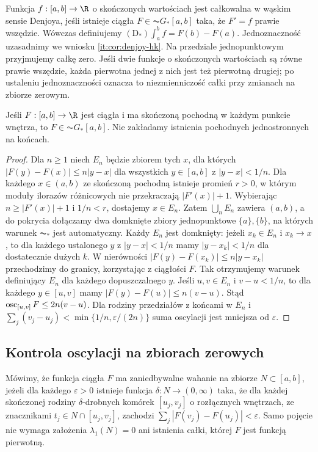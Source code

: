 \begin{definicja}\label{it:def:denjoy-narrow}
Funkcja $f:[a,b]\to\R$ o skończonych wartościach jest całkowalna w wąskim sensie Denjoya, jeśli istnieje ciągła $F\in\AC G_*[a,b]$ taka, że $F'=f$ prawie wszędzie. Wówczas definiujemy $(\mathrm D_*)\int_a^b f=F(b)-F(a)$. Jednoznaczność uzasadnimy we wniosku \ref{it:cor:denjoy-hk}. Na przedziale jednopunktowym przyjmujemy całkę zero. Jeśli dwie funkcje o skończonych wartościach są równe prawie wszędzie, każda pierwotna jednej z nich jest też pierwotną drugiej; po ustaleniu jednoznaczności oznacza to niezmienniczość całki przy zmianach na zbiorze zerowym.
\end{definicja}
\begin{twierdzenie}\label{it:thm:differentiable-acgstar}
Jeśli $F:[a,b]\to\R$ jest ciągła i ma skończoną pochodną w każdym punkcie wnętrza, to $F\in\AC G_*[a,b]$. Nie zakładamy istnienia pochodnych jednostronnych na końcach.
\end{twierdzenie}
\begin{proof}
Dla $n\ge1$ niech $E_n$ będzie zbiorem tych $x$, dla których $|F(y)-F(x)|\le n|y-x|$ dla wszystkich $y\in[a,b]$ z $|y-x|<1/n$. Dla każdego $x\in(a,b)$ ze skończoną pochodną istnieje promień $r>0$, w którym moduły ilorazów różnicowych nie przekraczają $|F'(x)|+1$. Wybierając $n\ge |F'(x)|+1$ i $1/n<r$, dostajemy $x\in E_n$. Zatem $\bigcup_n E_n$ zawiera $(a,b)$, a do pokrycia dołączamy dwa domknięte zbiory jednopunktowe $\{a\},\{b\}$, na których warunek $\AC_*$ jest automatyczny. Każdy $E_n$ jest domknięty: jeżeli $x_k\in E_n$ i $x_k\to x$, to dla każdego ustalonego $y$ z $|y-x|<1/n$ mamy $|y-x_k|<1/n$ dla dostatecznie dużych $k$. W nierówności $|F(y)-F(x_k)|\le n|y-x_k|$ przechodzimy do granicy, korzystając z ciągłości $F$. Tak otrzymujemy warunek definiujący $E_n$ dla każdego dopuszczalnego $y$. Jeśli $u,v\in E_n$ i $v-u<1/n$, to dla każdego $y\in[u,v]$ mamy $|F(y)-F(u)|\le n(v-u)$. Stąd $\operatorname{osc}_{[u,v]}F\le2n(v-u)$. Dla rodziny przedziałów z końcami w $E_n$ i $\sum_j(v_j-u_j)<\min\{1/n,\varepsilon/(2n)\}$ suma oscylacji jest mniejsza od $\varepsilon$.
\end{proof}
\subsection{Kontrola oscylacji na zbiorach zerowych}
Mówimy, że funkcja ciągła $F$ ma zaniedbywalne wahanie
na zbiorze $N\subset[a,b]$, jeżeli dla każdego
$\varepsilon>0$ istnieje funkcja $\delta:N\to(0,\infty)$
taka, że dla każdej skończonej rodziny
$\delta$-drobnych komórek $[u_j,v_j]$ o rozłącznych
wnętrzach, ze znacznikami $t_j\in N\cap[u_j,v_j]$,
zachodzi $\sum_j|F(v_j)-F(u_j)|<\varepsilon$.
Samo pojęcie nie wymaga założenia $\lambda_1(N)=0$
ani istnienia całki, której $F$ jest funkcją pierwotną.

